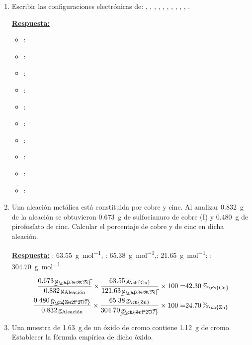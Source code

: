 \documentclass[10pt,a4paper]{article}
\newcommand{\rta}{\underline{\textbf{Respuesta:}} }
\begin{document}
\begin{enumerate}
	\item Escribir las configuraciones electr\'{o}nicas de: , , , , , , ,  , ,
	, .
	
	\rta
	\begin{itemize}
		\item {}: 
		\item {}: 
		\item {}: 
		\item {}: 
		\item {}: 
		\item {}: 
		\item {}: 
		\item {}: 
		\item {}: 
		\item {}: 
	\end{itemize}
	\item Una aleación metálica está constituida por cobre y cinc. Al analizar \SI{0,832}{\gram} de la aleación se
	obtuvieron \SI{0,673}{\gram} de sulfocianuro de cobre (I) y \SI{0,480}{\gram} de pirofosfato de cinc. Calcular el
	porcentaje de cobre y de cinc en dicha aleación.
	
	\rta {}: \SI{63.55}{\gram\per\mole}, : \SI{65.38}{\gram\per\mole},: \SI{21.65}{\gram\per\mole}; : \SI{304.70}{\gram\per\mole}
	
	\begin{align*}
	\frac{\SI{0.673}{\cancel\gram\of{\ch{CUSCN}}}}{\SI{0.832}{\gram\of{Aleaci\acute{o}n}}} \times \frac{\SI{63.55}{\gram\of{\ch{Cu}}}}{\SI{121.63}{\cancel\gram\of{\ch{CUSCN}}}} \times 100 =& \SI{42.30}{\percent\of{\ch{Cu}}} \\
	\frac{\SI{0.480}{\cancel\gram\of{\ch{Zn2P2O7}}}}{\SI{0.832}{\gram\of{Aleaci\acute{o}n}}} \times \frac{\SI{65.38}{\gram\of{\ch{Zn}}}}{\SI{304.70}{\cancel\gram\of{\ch{ZnP2O7}}}} \times 100 =& \SI{24.70}{\percent\of{\ch{Zn}}}
	\end{align*}
	
	\item Una muestra de \SI{1,63}{\gram} de un óxido de cromo contiene \SI{1,12}{\gram} de cromo. Establecer la fórmula empírica de dicho óxido.
	

\end{enumerate}
\end{document}
